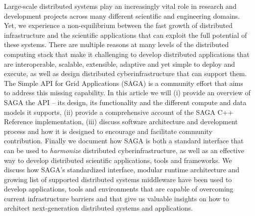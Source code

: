 \documentclass[a4paper,10pt]{article}
\newcommand{\jhanote}[1]{  {\textcolor{red}     { ***Shantenu: #1 }}}
\newcommand{\jhanote}[1]{}
\begin{document}
Large-scale distributed systems play an increasingly vital role in
research and development projects across many different scientific and
engineering domains. Yet, we experience a non-equilibrium between the
fast growth of distributed infrastructure and the scientific
applications that can exploit the full potential of these
systems. There are multiple reasons at many levels of the distributed
computing stack that make it challenging to develop distributed
applications that are interoperable, scalable, extensible, adaptive
and yet simple to deploy and execute, as well as design distributed
cyberinfrastructure that can support them.  The Simple API for Grid
Applications (SAGA) is a community effort that aims to address this
missing capability.  In this article we will (i) provide an overview
of SAGA the API -- its design, its functionality and the different
compute and data models it supports, (ii) provide a comprehensive
account of the SAGA C++ Reference implementation, (iii) discuss
software architecture and development process and how it is designed
to encourage and facilitate community contribution.  Finally we
document how SAGA is both a standard interface that can be used to
{\it harmonize} distributed cyberinfrastructure, as well as an
effective way to develop distributed scientific applications, tools
and frameworks.  We discuss how SAGA's standardized interface, modular
runtime architecture and growing list of supported distributed systems
middleware have been used to develop applications, tools and
environments that are capable of overcoming current infrastructure
barriers and that give us valuable insights on how to architect
next-generation distributed systems and applications.

\end{document}
